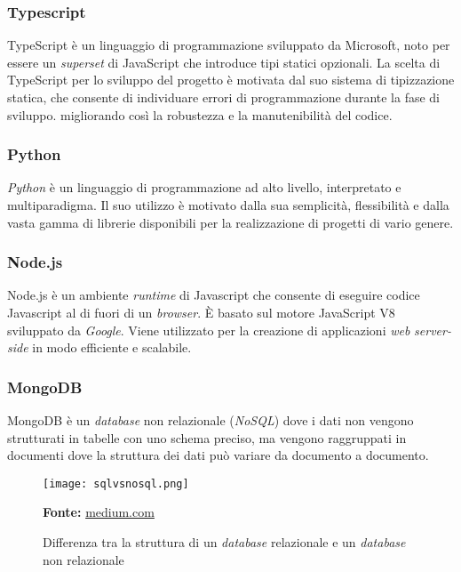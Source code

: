\subsubsection{Typescript}
TypeScript è un linguaggio di programmazione sviluppato da Microsoft, noto per essere un \textit{superset} di JavaScript che introduce tipi statici opzionali. La scelta di TypeScript per lo sviluppo del progetto è motivata dal suo sistema di tipizzazione statica, che consente di individuare errori di programmazione durante la fase di sviluppo.
migliorando così la robustezza e la manutenibilità del codice.

\subsubsection{Python}
\textit{Python} è un linguaggio di programmazione ad alto livello, interpretato e multiparadigma. Il suo utilizzo è motivato dalla sua semplicità, flessibilità e dalla vasta gamma di librerie disponibili per la realizzazione di progetti di vario genere.
\subsubsection{Node.js}
Node.js è un ambiente \textit{runtime} di Javascript che consente di eseguire codice Javascript al di fuori di un \textit{browser}. È basato sul motore JavaScript V8 sviluppato da \textit{Google}. Viene utilizzato per la creazione di applicazioni \textit{web} \textit{server-side} in modo efficiente e scalabile.
\subsubsection{MongoDB}
MongoDB è un \textit{database} non relazionale (\textit{NoSQL}) dove i dati non vengono strutturati in tabelle con uno schema preciso, ma vengono raggruppati in documenti dove la struttura dei dati può variare da documento a documento.  
\begin{figure}[H]
    \centering
    \texttt{[image: sqlvsnosql.png]}
    \caption{Differenza tra la struttura di un \textit{database} relazionale e un \textit{database} non relazionale}
    \small \textbf{Fonte:} \href{https://naveen-metta.medium.com/decoding-the-database-dilemma-sql-vs-nosql-in-system-design-876e21f4a58c}{medium.com}
    \label{fig:sql-vs-nosql}
\end{figure} 

